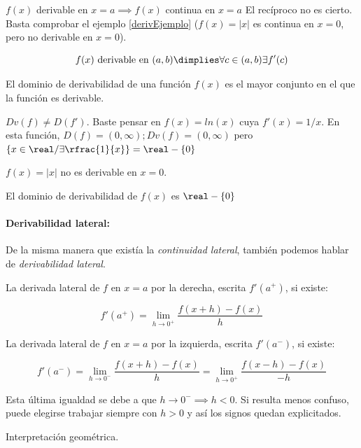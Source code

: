\begin{prop}
$f(x)$ derivable en $x=a \implies f(x)$ continua en $x=a$
\obs El recíproco no es cierto. Basta comprobar el ejemplo \ref{derivEjemplo} ($f(x) = |x|$ es continua en $x=0$, pero no derivable en $x=0$).
\end{prop}

\begin{defn}
\[f(x) \text{ derivable en } (a,b) \dimplies \forall c\in(a,b) \exists f'(c) \]
\end{defn}

\begin{defn}
El dominio de derivabilidad de una función $f(x)$ es el mayor conjunto en el que la función es derivable.
\end{defn}

\obs $Dv(f) \neq D(f')$. Baste pensar en $f(x) = ln(x)$ cuya $f'(x) = 1/x$. En esta función, $D(f) = (0,\infty); Dv(f) = (0,\infty)$ pero $\{x\in \real / \exists \rfrac{1}{x}\} = \real - \{0\}$

\begin{example}
$f(x) = |x|$ no es derivable en $x=0$.

El dominio de derivabilidad de $f(x)$ es $\real-\{0\}$
\end{example}


\paragraph{Derivabilidad lateral:} De la misma manera que existía la \textit{continuidad lateral}, también podemos hablar de \textit{derivabilidad lateral}. 

\begin{defn}
La derivada lateral de $f$ en $x=a$ por la derecha, escrita $f'(a^+)$, si existe:

\[f'(a^+) = \lim_{h\to 0^+} \frac{f(x+h)-f(x)}{h}\]

La derivada lateral de $f$ en $x=a$ por la izquierda, escrita $f'(a^-)$, si existe:

\[f'(a^-) = \lim_{h\to 0^-} \frac{f(x+h)-f(x)}{h} =  \lim_{h\to 0^+} \frac{f(x-h)-f(x)}{-h}\]

\obs Esta última igualdad se debe a que $h\to 0^-\implies h<0$. Si resulta menos confuso, puede elegirse trabajar siempre con $h>0$ y así los signos quedan explicitados.
\end{defn}

\obs Interpretación geométrica.

